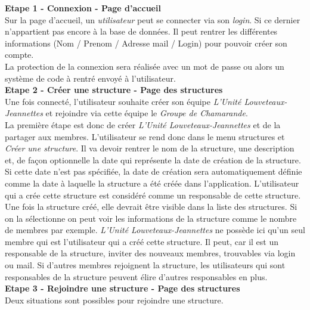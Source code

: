 \newline
\textbf{Etape 1 - Connexion - Page d'accueil}\\
Sur la page d'accueil, un \textit{utilisateur} peut se connecter via son \textit{login}. Si ce dernier n'appartient pas encore à la base de données. Il peut rentrer les différentes informations (Nom / Prenom / Adresse mail / Login) pour pouvoir créer son compte. \\
\newline 
La protection de la connexion sera réalisée avec un mot de passe ou alors un système de code à rentré envoyé à l'utilisateur. \\
\newline
\textbf{Etape 2 - Créer une structure - Page des structures}\\
Une fois connecté, l'utilisateur souhaite créer son équipe \textit{L’Unité Louveteaux-Jeannettes} et rejoindre via cette équipe le \textit{Groupe de Chamarande}.\\
\newline
La première étape est donc de créer \textit{L’Unité Louveteaux-Jeannettes} et de la partager aux membres. L'utilisateur se rend donc dans le menu structures et \textit{Créer une structure}. Il va devoir rentrer le nom de la structure, une description et, de façon optionnelle la date qui représente la date de création de la structure. Si cette date n'est pas spécifiée, la date de création sera automatiquement définie comme la date à laquelle la structure a été créée dans l'application. L'utilisateur qui a crée cette structure est considéré comme un responsable de cette structure.\\
\newline
Une fois la structure créé, elle devrait être visible dans la liste des structures. Si on la sélectionne on peut voir les informations de la structure comme le nombre de membres par exemple. \textit{L’Unité Louveteaux-Jeannettes} ne possède ici qu'un seul membre qui est l'utilisateur qui a créé cette structure. Il peut, car il est un responsable de la structure, inviter des nouveaux membres, trouvables via login ou mail. Si d'autres membres rejoignent la structure, les utilisateurs qui sont responsables de la structure peuvent élire d'autres responsables en plus.\\
\newline
\textbf{Etape 3 - Rejoindre une structure - Page des structures}\\
Deux situations sont possibles pour rejoindre une structure. 
